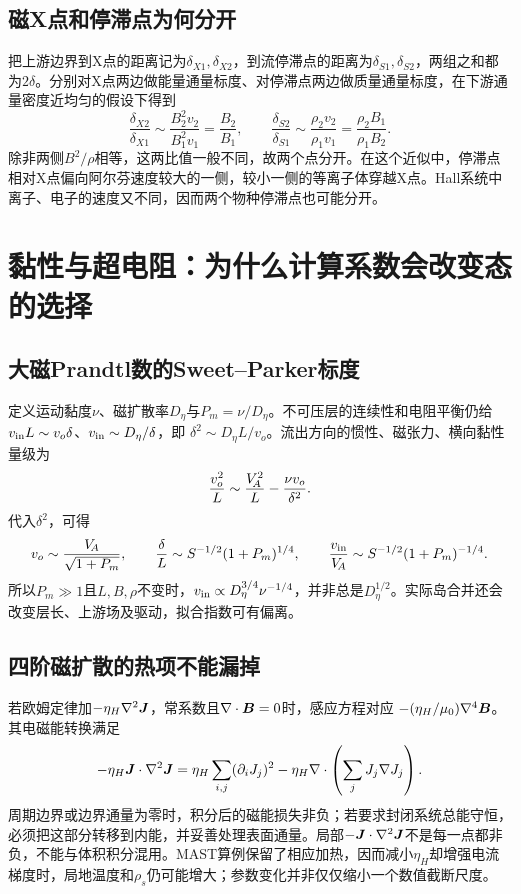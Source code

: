 \documentclass[UTF8,a4paper,11pt,openany,fontset=fandol]{ctexbook}
\begin{document}
\subsection{磁X点和停滞点为何分开}
把上游边界到X点的距离记为$\delta_{X1},\delta_{X2}$，到流停滞点的距离为$\delta_{S1},\delta_{S2}$，两组之和都为$2\delta$。分别对X点两边做能量通量标度、对停滞点两边做质量通量标度，在下游通量密度近均匀的假设下得到
\begin{equation}
 \frac{\delta_{X2}}{\delta_{X1}}
 \sim\frac{B_2^2v_2}{B_1^2v_1}=\frac{B_2}{B_1},\qquad
 \frac{\delta_{S2}}{\delta_{S1}}
 \sim\frac{\rho_2v_2}{\rho_1v_1}=\frac{\rho_2B_1}{\rho_1B_2}.
\end{equation}
除非两侧$B^2/\rho$相等，这两比值一般不同，故两个点分开。在这个近似中，停滞点相对X点偏向阿尔芬速度较大的一侧，较小一侧的等离子体穿越X点。Hall系统中离子、电子的速度又不同，因而两个物种停滞点也可能分开。

\section{黏性与超电阻：为什么计算系数会改变态的选择}
\subsection{大磁Prandtl数的Sweet--Parker标度}
定义运动黏度$\nu$、磁扩散率$D_\eta$与$P_m=\nu/D_\eta$。不可压层的连续性和电阻平衡仍给
$v_{\rm in}L\sim v_o\delta$、$v_{\rm in}\sim D_\eta/\delta$，即
$\delta^2\sim D_\eta L/v_o$。流出方向的惯性、磁张力、横向黏性量级为
\begin{equation}
 \frac{v_o^2}{L}\sim\frac{V_{\!A}^2}{L}-\frac{\nu v_o}{\delta^2}.
\end{equation}
代入$\delta^2$，可得
\begin{equation}
 v_o\sim\frac{V_{\!A}}{\sqrt{1+P_m}},\qquad
 \frac{\delta}{L}\sim S^{-1/2}(1+P_m)^{1/4},\qquad
 \frac{v_{\rm in}}{V_{\!A}}\sim S^{-1/2}(1+P_m)^{-1/4}.
\end{equation}
所以$P_m\gg1$且$L,B,\rho$不变时，$v_{\rm in}\propto D_\eta^{3/4}\nu^{-1/4}$，并非总是$D_\eta^{1/2}$。实际岛合并还会改变层长、上游场及驱动，拟合指数可有偏离。\citep{Stanier2013}

\subsection{四阶磁扩散的热项不能漏掉}
若欧姆定律加$-\eta_H\nabla^2\bm{J}$，常系数且$\nabla\cdot\bm{B}=0$时，感应方程对应
$-(\eta_H/\mu_0)\nabla^4\bm{B}$。其电磁能转换满足
\begin{equation}
 -\eta_H\bm{J}\cdot\nabla^2\bm{J}
 =\eta_H\sum_{i,j}(\partial_iJ_j)^2
 -\eta_H\nabla\cdot\left(\sum_jJ_j\nabla J_j\right).
\end{equation}
周期边界或边界通量为零时，积分后的磁能损失非负；若要求封闭系统总能守恒，必须把这部分转移到内能，并妥善处理表面通量。局部$-\bm{J}\cdot\nabla^2\bm{J}$不是每一点都非负，不能与体积积分混用。MAST算例保留了相应加热，因而减小$\eta_H$却增强电流梯度时，局地温度和$\rho_s$仍可能增大；参数变化并非仅仅缩小一个数值截断尺度。\citep{Stanier2013}
\end{document}
